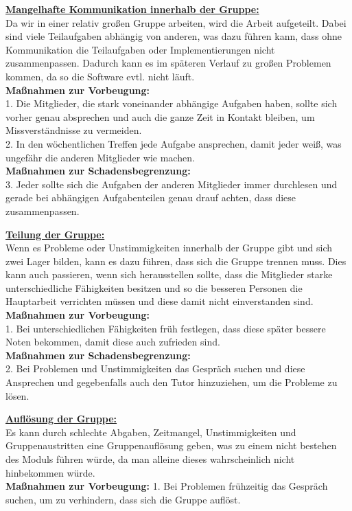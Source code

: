 \documentclass[fontsize=12pt,paper=a4,twoside]{scrartcl}
\begin{document}
\bigskip

\textbf{\underline{Mangelhafte Kommunikation innerhalb der Gruppe:}}\\
Da wir in einer relativ großen Gruppe arbeiten, wird die Arbeit aufgeteilt. Dabei sind viele Teilaufgaben abhängig von anderen, was dazu führen kann, dass ohne Kommunikation die Teilaufgaben oder Implementierungen nicht zusammenpassen. Dadurch kann es im späteren Verlauf zu großen Problemen kommen, da so die Software evtl. nicht läuft.\\
\textbf{Maßnahmen zur Vorbeugung:}\\
1. Die Mitglieder, die stark voneinander abhängige Aufgaben haben, sollte sich vorher genau absprechen und auch die ganze Zeit in Kontakt bleiben, um Missverständnisse zu vermeiden.\\
2. In den wöchentlichen Treffen jede Aufgabe ansprechen, damit jeder weiß, was ungefähr die anderen Mitglieder wie machen.\\
\textbf{Maßnahmen zur Schadensbegrenzung:}\\
3. Jeder sollte sich die Aufgaben der anderen Mitglieder immer durchlesen und gerade bei abhängigen Aufgabenteilen genau drauf achten, dass diese zusammenpassen.\\

\bigskip

\textbf{\underline{Teilung der Gruppe:}}\\
Wenn es Probleme oder Unstimmigkeiten innerhalb der Gruppe gibt und sich zwei Lager bilden, kann es dazu führen, dass sich die Gruppe trennen muss. Dies kann auch passieren, wenn sich herausstellen sollte, dass die Mitglieder starke unterschiedliche Fähigkeiten besitzen und so die besseren Personen die Hauptarbeit verrichten müssen und diese damit nicht einverstanden sind.\\
\textbf{Maßnahmen zur Vorbeugung:}\\
1. Bei unterschiedlichen Fähigkeiten früh festlegen, dass diese später bessere Noten bekommen, damit diese auch zufrieden sind.\\
\textbf{Maßnahmen zur Schadensbegrenzung:}\\
2. Bei Problemen und Unstimmigkeiten das Gespräch suchen und diese Ansprechen und gegebenfalls auch den Tutor hinzuziehen, um die Probleme zu lösen.\\

\bigskip

\textbf{\underline{Auflösung der Gruppe:}}\\
Es kann durch schlechte Abgaben, Zeitmangel, Unstimmigkeiten und Gruppenaustritten eine Gruppenauflösung geben, was zu einem nicht bestehen des Moduls führen würde, da man alleine dieses wahrscheinlich nicht hinbekommen würde. \\
\textbf{Maßnahmen zur Vorbeugung:}
1. Bei Problemen frühzeitig das Gespräch suchen, um zu verhindern, dass sich die Gruppe auflöst.\\
\end{document}
